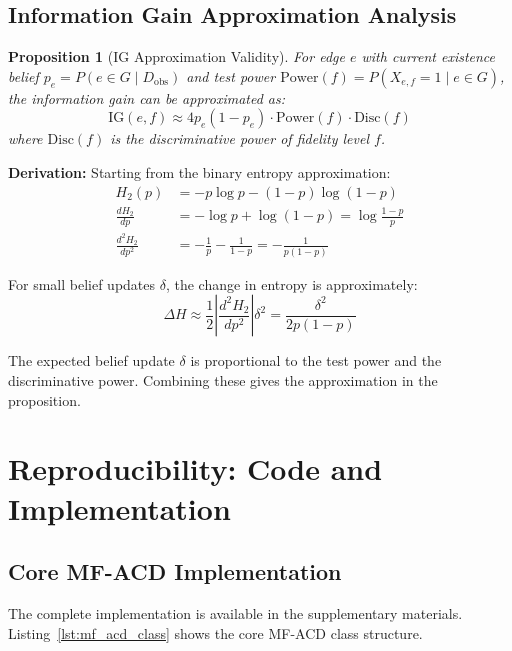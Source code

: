 \documentclass{article}
\newtheorem{proposition}{Proposition}
\begin{document}
\subsection{Information Gain Approximation Analysis}

\begin{proposition}[IG Approximation Validity]
For edge $e$ with current existence belief $p_e = P(e \in G \mid D_{\text{obs}})$ and test power $\text{Power}(f) = P(X_{e,f} = 1 \mid e \in G)$, the information gain can be approximated as:
\begin{equation}
\text{IG}(e, f) \approx 4 p_e(1-p_e) \cdot \text{Power}(f) \cdot \text{Disc}(f)
\end{equation}
where $\text{Disc}(f)$ is the discriminative power of fidelity level $f$.
\end{proposition}

\textbf{Derivation:} Starting from the binary entropy approximation:
\begin{align}
H_2(p) &= -p \log p - (1-p) \log(1-p) \\
\frac{dH_2}{dp} &= -\log p + \log(1-p) = \log\frac{1-p}{p} \\
\frac{d^2H_2}{dp^2} &= -\frac{1}{p} - \frac{1}{1-p} = -\frac{1}{p(1-p)}
\end{align}

For small belief updates $\delta$, the change in entropy is approximately:
\begin{equation}
\Delta H \approx \frac{1}{2} \left|\frac{d^2H_2}{dp^2}\right| \delta^2 = \frac{\delta^2}{2p(1-p)}
\end{equation}

The expected belief update $\delta$ is proportional to the test power and the discriminative power. Combining these gives the approximation in the proposition.

\section{Reproducibility: Code and Implementation}

\subsection{Core MF-ACD Implementation}

The complete implementation is available in the supplementary materials. Listing~\ref{lst:mf_acd_class} shows the core MF-ACD class structure.
\end{document}
